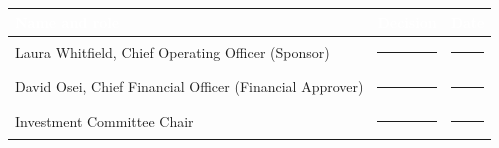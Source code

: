 \begin{center}
\begin{tabularx}{\linewidth}{@{}Y Y c@{}}
\toprule
{}
\textcolor{white}{\textbf{Name and role}} & \textcolor{white}{\textbf{Decision}} &
  \textcolor{white}{\textbf{Date}} \\
\midrule
Laura Whitfield, Chief Operating Officer (Sponsor) & \rule{3.2cm}{0.4pt} & \rule{2cm}{0.4pt} \\
David Osei, Chief Financial Officer (Financial Approver) & \rule{3.2cm}{0.4pt} & \rule{2cm}{0.4pt} \\
Investment Committee Chair & \rule{3.2cm}{0.4pt} & \rule{2cm}{0.4pt} \\
\bottomrule
\end{tabularx}
\end{center}
